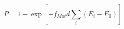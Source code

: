 \documentclass[12pt]{article}
\begin{document}
$$
P = 1 -\exp\left[-f_{Mat}d\sum_{i}\left(E_{i}-E_{0}\right)\right]
$$
\end{document}
